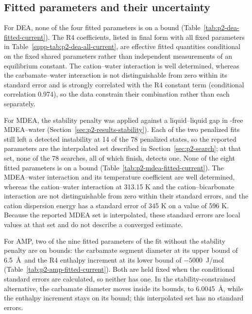 \subsection{Fitted parameters and their uncertainty}\label{sec:p2-results-parameters}
For DEA, none of the four fitted parameters is on a bound (Table~\ref{tab:p2-dea-fitted-current}).
The R4 coefficients, listed in final form with all fixed parameters in Table~\ref{supp-tab:p2-dea-all-current}, are effective fitted quantities conditional on the fixed shared parameters rather than independent measurements of an equilibrium constant.
The cation--water interaction is well determined, whereas the carbamate--water interaction is not distinguishable from zero within its standard error and is strongly correlated with the R4 constant term (conditional correlation 0.974), so the data constrain their combination rather than each separately.



For MDEA, the stability penalty was applied against a liquid--liquid gap in \COtwo-free MDEA--water (Section~\ref{sec:p2-results-stability}).
Each of the two penalized fits still left a detected instability at 14 of the 78 penalized states, so the reported parameters are the interpolated set described in Section~\ref{sec:p2-search}; at that set, none of the 78 searches, all of which finish, detects one.
None of the eight fitted parameters is on a bound (Table~\ref{tab:p2-mdea-fitted-current}).
The MDEA--water interaction and its temperature coefficient are well determined, whereas the cation--water interaction at 313.15 K and the cation--bicarbonate interaction are not distinguishable from zero within their standard errors, and the cation dispersion energy has a standard error of 345 K on a value of 596 K.
Because the reported MDEA set is interpolated, these standard errors are local values at that set and do not describe a converged estimate.



For AMP, two of the nine fitted parameters of the fit without the stability penalty are on bounds: the carbamate segment diameter at its upper bound of 6.5~\AA\ and the R4 enthalpy increment at its lower bound of $-5000$~J/mol (Table~\ref{tab:p2-amp-fitted-current}).
Both are held fixed when the conditional standard errors are calculated, so neither has one.
In the stability-constrained alternative, the carbamate diameter moves inside its bounds, to 6.0045~\AA, while the enthalpy increment stays on its bound; this interpolated set has no standard errors.

